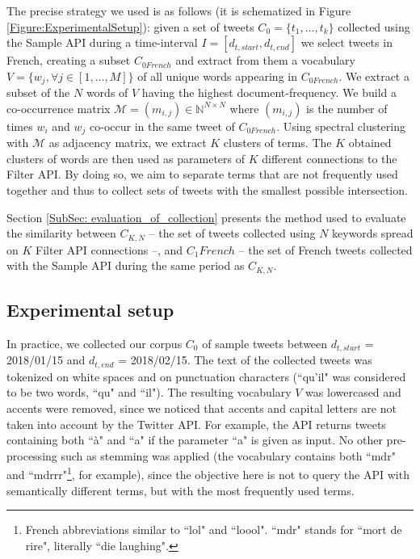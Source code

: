 The precise strategy we used is as follows (it is schematized in Figure \ref{Figure:ExperimentalSetup}): given a set of tweets $C_{0}=\{t_{1},\ldots, t_{k}\}$  collected using the Sample API during a time-interval $I = [d_{t,start}, d_{t,end}]$ we select tweets in French, creating a subset $C_{0 French}$ and extract from them a vocabulary $V = \{w_j, \forall j\in[1, \ldots,M]\}$ of all unique words appearing in $C_{0 French}$. We extract a subset of the $N$ words of $V$ having the highest document-frequency. We build a co-occurrence matrix $\mathcal{M} = (m_{i,j}) \in \mathbb{N}^{N\times N}$ where $(m_{i,j})$ is the number of times $w_i$ and $w_j$ co-occur in the same tweet of $C_{0 French}$. Using spectral clustering with $\mathcal{M}$ as adjacency matrix, we extract  $K$ clusters of terms. The $K$ obtained clusters of words are then used as parameters of $K$ different connections to the Filter API. By doing so, we aim to separate terms that are not frequently used together and thus to collect sets of tweets with the smallest possible intersection.


Section \ref{SubSec: evaluation_of_collection} presents the method used to evaluate the similarity between $C_{K,N}$ -- the set of tweets collected using $N$ keywords spread on $K$ Filter API connections --, and $C_1 French$ -- the set of French tweets collected with the Sample API during the same period as $C_{K,N}$.

			\subsection{Experimental setup}

In practice, we collected our corpus $C_0$ of sample tweets between $d_{t,start} $ = 2018/01/15 and $d_{t,end}$ = 2018/02/15. The text of the collected tweets was tokenized on white spaces and on punctuation characters (``qu'il" was considered to be two words, ``qu" and ``il"). The resulting vocabulary $V$ was lowercased and accents were removed, since we noticed that accents and capital letters are not taken into account by the Twitter API. For example, the API returns tweets containing both ``à" and ``a" if the parameter ``a" is given as input. No other pre-processing such as stemming was applied (the vocabulary contains both ``mdr" and ``mdrrr"\footnote{French abbreviations similar to ``lol" and ``loool". ``mdr" stands for ``mort de rire", literally ``die laughing".}, for example), since the objective here is not to query the API with semantically different terms, but with the most frequently used terms.


